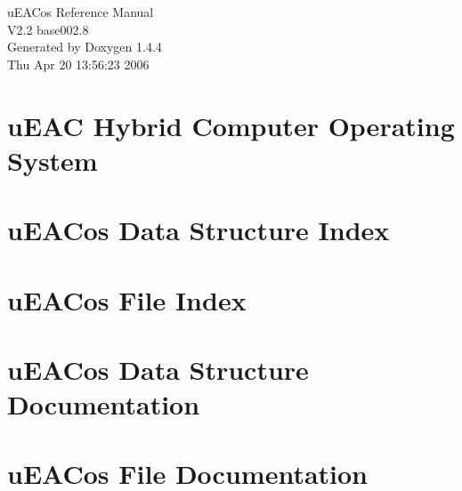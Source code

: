 \documentclass[a4paper]{book}
\begin{document}
\begin{titlepage}
\vspace*{7cm}
\begin{center}
{\Large u\-EACos Reference Manual\\[1ex]\large V2.2 base002.8 }\\
\vspace*{1cm}
{\large Generated by Doxygen 1.4.4}\\
\vspace*{0.5cm}
{\small Thu Apr 20 13:56:23 2006}\\
\end{center}
\end{titlepage}
\clearemptydoublepage
{}
\tableofcontents
\clearemptydoublepage
{}
\chapter{u\-EAC Hybrid Computer Operating System }
\label{index}
\chapter{u\-EACos Data Structure Index}

\chapter{u\-EACos File Index}

\chapter{u\-EACos Data Structure Documentation}







\chapter{u\-EACos File Documentation}
























\printindex
\end{document}
